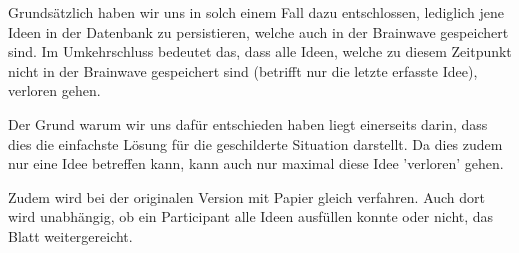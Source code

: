 Grundsätzlich haben wir uns in solch einem Fall dazu entschlossen, lediglich jene Ideen in der Datenbank zu persistieren, welche auch in der Brainwave gespeichert sind. Im Umkehrschluss bedeutet das, dass alle Ideen, welche zu diesem Zeitpunkt nicht in der Brainwave gespeichert sind (betrifft nur die letzte erfasste Idee), verloren gehen. 

Der Grund warum wir uns dafür entschieden haben liegt einerseits darin, dass dies die einfachste Lösung für die geschilderte Situation darstellt. Da dies zudem nur eine Idee betreffen kann, kann auch nur maximal diese Idee 'verloren' gehen. 

Zudem wird bei der originalen Version mit Papier gleich verfahren. Auch dort wird unabhängig, ob ein Participant alle Ideen ausfüllen konnte oder nicht, das Blatt weitergereicht. 